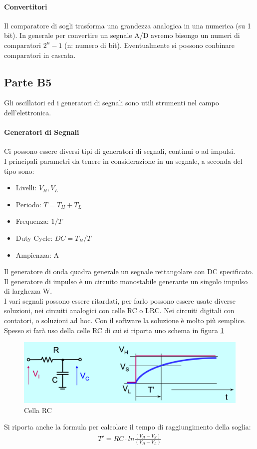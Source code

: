 \documentclass[12pt]{article}
\begin{document}
\paragraph{Convertitori} Il comparatore di sogli trasforma una grandezza analogica in una numerica (su 1 bit). In generale per convertire un segnale A/D avremo bisongo un numeri di comparatori $2^n-1$ (n: numero di bit). Eventualmente si possono conbinare comparatori in cascata.

\subsection{Parte B5}\label{b5}
Gli oscillatori ed i generatori di segnali sono utili strumenti nel campo dell'elettronica.

\paragraph{Generatori di Segnali} Ci possono essere diversi tipi di generatori di segnali, continui o ad impulsi.\\
I principali parametri da tenere in considerazione in un segnale, a seconda del tipo sono:
\begin{itemize}
  \item Livelli: $V_{H}, V_{L}$
  \item Periodo: $T = T_{H} + T_{L}$
  \item Frequenza: $1/T$
  \item Duty Cycle: $DC = T_{H}/T$
  \item Ampienzza: A
\end{itemize}
Il generatore di onda quadra generale un segnale rettangolare con DC specificato. Il generatore di impulso è un circuito monostabile generante un singolo impulso di larghezza W.\\
I vari segnali possono essere ritardati, per farlo possono essere usate diverse soluzioni, nei circuiti analogici con celle RC o LRC. Nei circuiti digitali con contatori, o soluzioni ad hoc. Con il software la soluzione è molto più semplice. Spesso si farà uso della celle RC di cui si riporta uno schema in figura \ref{fig:rc}
\begin{figure}[!hp]
  \includegraphics[width=\textwidth]{images/cellRC.png}
  \caption{Cella RC}
  \label{fig:rc}
\end{figure}
Si riporta anche la formula per calcolare il tempo di raggiungimento della soglia:\\
\begin{equation}
  \begin{gathered}
    T' = RC\cdot ln\frac {(V_{H}-V_{S})} {(V_{H}-V_{L})}
    \label{eq:tsoglie}
  \end{gathered}
\end{equation}
\end{document}
